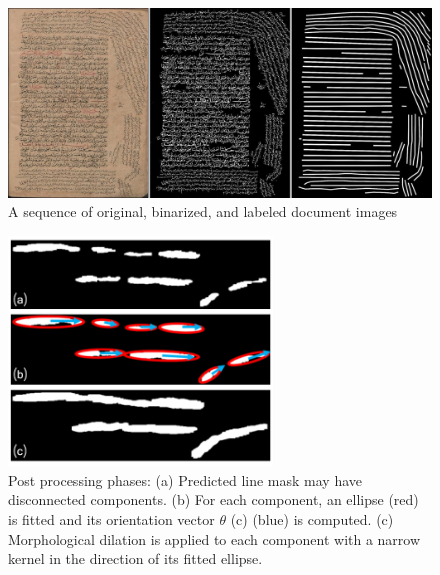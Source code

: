 \begin{figure}[!htb]
    \centering
    \includegraphics[width=12cm]{images/fcn_image.jpg}
    \caption{A sequence of original, binarized, and labeled document images}
    \label{fig:fcn_image}
\end{figure}
\begin{figure}[!htb]
    \centering
    \includegraphics[width=7cm]{images/FCN_post.png}
    \caption{Post processing phases: (a) Predicted line mask may have disconnected components. (b) For each component, an ellipse (red) is fitted and its orientation vector $\theta$ (c) (blue) is computed. (c) Morphological dilation is applied to each component with a narrow kernel in the direction of its fitted ellipse.}
    \label{fig:fcn_post}
\end{figure}


